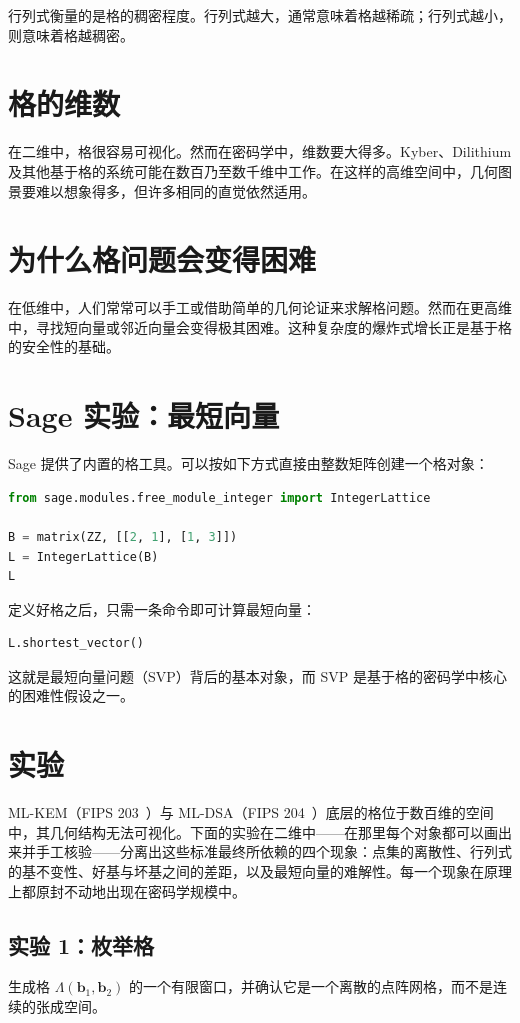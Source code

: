 行列式衡量的是格的稠密程度。行列式越大，通常意味着格越稀疏；行列式越小，则意味着格越稠密。

\section{格的维数}
在二维中，格很容易可视化。然而在密码学中，维数要大得多。Kyber、Dilithium 及其他基于格的系统可能在数百乃至数千维中工作。在这样的高维空间中，几何图景要难以想象得多，但许多相同的直觉依然适用。

\section{为什么格问题会变得困难}
在低维中，人们常常可以手工或借助简单的几何论证来求解格问题。然而在更高维中，寻找短向量或邻近向量会变得极其困难。这种复杂度的爆炸式增长正是基于格的安全性的基础。

\section{Sage 实验：最短向量}
Sage 提供了内置的格工具。可以按如下方式直接由整数矩阵创建一个格对象：

\begin{lstlisting}[language=Python]
from sage.modules.free_module_integer import IntegerLattice

B = matrix(ZZ, [[2, 1], [1, 3]])
L = IntegerLattice(B)
L
\end{lstlisting}

定义好格之后，只需一条命令即可计算最短向量：

\begin{lstlisting}[language=Python]
L.shortest_vector()
\end{lstlisting}

这就是最短向量问题（SVP）背后的基本对象，而 SVP 是基于格的密码学中核心的困难性假设之一。

\section{实验}

ML-KEM（FIPS 203~\cite{fips203}）与 ML-DSA（FIPS 204~\cite{fips204}）底层的格位于数百维的空间中，其几何结构无法可视化。下面的实验在二维中——在那里每个对象都可以画出来并手工核验——分离出这些标准最终所依赖的四个现象：点集的离散性、行列式的基不变性、好基与坏基之间的差距，以及最短向量的难解性。每一个现象在原理上都原封不动地出现在密码学规模中。

\subsection{实验 1：枚举格}
生成格 $\Lambda(\mathbf{b}_1,\mathbf{b}_2)$ 的一个有限窗口，并确认它是一个离散的点阵网格，而不是连续的张成空间。

